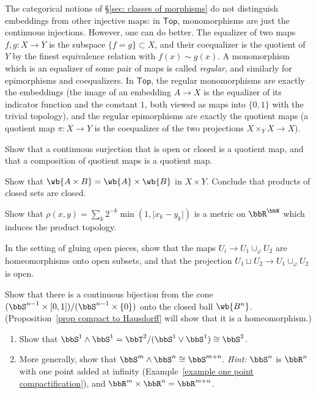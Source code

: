 \begin{rem}
    The categorical notions of \S\ref{sec: classes of morphisms} do not distinguish embeddings from other injective maps: in $\mathsf{Top}$, monomorphisms are just the continuous injections. However, one can do better. The equalizer of two maps $f,g:X\to Y$ is the subspace $\{f=g\}\subset X$, and their coequalizer is the quotient of $Y$ by the finest equivalence relation with $f(x)\sim g(x)$. A monomorphism which is an equalizer of some pair of maps is called \emph{regular}, and similarly for epimorphisms and coequalizers. In $\mathsf{Top}$, the regular monomorphisms are exactly the embeddings (the image of an embedding $A\to X$ is the equalizer of its indicator function and the constant $1$, both viewed as maps into $\{0,1\}$ with the trivial topology), and the regular epimorphisms are exactly the quotient maps (a quotient map $\pi:X\to Y$ is the coequalizer of the two projections $X\times_YX\to X$).
\end{rem}

\begin{xca}
    Show that a continuous surjection that is open or closed is a quotient map, and that a composition of quotient maps is a quotient map.
\end{xca}
\begin{xca}
    Show that $\wb{A\times B}=\wb{A}\times\wb{B}$ in $X\times Y$. Conclude that products of closed sets are closed.
\end{xca}
\begin{xca}
    Show that $\rho(x,y)=\sum_k2^{-k}\min(1,\lvert x_k-y_k\rvert)$ is a metric on $\bbR^\bbN$ which induces the product topology.
\end{xca}
\begin{xca}\label{xca gluing open pieces}
    In the setting of gluing open pieces, show that the maps $U_i\to U_1\cup_\varphi U_2$ are homeomorphisms onto open subsets, and that the projection $U_1\sqcup U_2\to U_1\cup_\varphi U_2$ is open.
\end{xca}
\begin{xca}
    Show that there is a continuous bijection from the cone $(\bbS^{n-1}\times[0,1])/(\bbS^{n-1}\times\{0\})$ onto the closed ball $\wb{B^n}$. (Proposition~\ref{prop compact to Hausdorff} will show that it is a homeomorphism.)
\end{xca}
\begin{xca}\label{wedge sums}
    \begin{enumerate}
        \item Show that $\bbS^1\wedge \bbS^1=\bbT^2/(\bbS^1\vee\bbS^1)\cong \bbS^2$.
        \item More generally, show that $\bbS^m\wedge \bbS^n\cong \bbS^{m+n}$. \emph{Hint:} $\bbS^n$ is $\bbR^n$ with one point added at infinity (Example~\ref{example one point compactification}), and $\bbR^m\times\bbR^n=\bbR^{m+n}$.
    \end{enumerate}
\end{xca}


